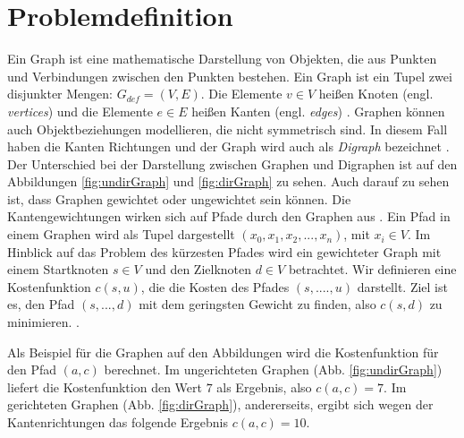 \section{Problemdefinition}
\label{Kostenfunktion}
Ein Graph ist eine mathematische Darstellung von Objekten, die aus Punkten und Verbindungen zwischen den Punkten bestehen. 
Ein Graph ist ein Tupel zwei disjunkter Mengen: $G_{def}= (V,E)$. Die Elemente $v \in V$ heißen Knoten (engl. \textit{vertices}) und die Elemente $e \in E$ heißen Kanten (engl. \textit{edges}) \cite[D1]{Gross.2004}. Graphen können auch Objektbeziehungen modellieren, die nicht symmetrisch sind. In diesem Fall haben die Kanten Richtungen und der Graph wird auch als \textit{Digraph} bezeichnet \cite[D19]{Gross.2004}. Der Unterschied bei der Darstellung zwischen Graphen und Digraphen ist auf den Abbildungen \ref{fig:undirGraph} und \ref{fig:dirGraph} zu sehen. Auch darauf zu sehen ist, dass Graphen gewichtet oder ungewichtet sein können. Die Kantengewichtungen wirken sich auf Pfade durch den Graphen aus \cite[D17f.]{Gross.2004}. 
Ein Pfad in einem Graphen wird als Tupel dargestellt $\left ( x_{0}, x_{1}, x_{2}, ..., x_{n} \right )$, mit $x_{i} \in V$. 
Im Hinblick auf das Problem des kürzesten Pfades wird ein gewichteter Graph mit einem Startknoten $s \in V$ und den Zielknoten $d \in V$ betrachtet. Wir definieren eine Kostenfunktion $c(s,u)$, die die Kosten des Pfades $ (s, ...., u)$ darstellt. Ziel ist es, den Pfad  $\left ( s, ..., d \right )$ mit dem geringsten Gewicht zu finden, also $c(s,d)$ zu minimieren. \cite[S.4]{Madkour.2017}.

Als Beispiel für die Graphen auf den Abbildungen wird die Kostenfunktion für den Pfad $(a,c)$ berechnet. Im ungerichteten Graphen (Abb. \ref{fig:undirGraph}) liefert die Kostenfunktion den Wert $7$ als Ergebnis, also $c(a,c) = 7$. Im gerichteten Graphen (Abb. \ref{fig:dirGraph}), andererseits, ergibt sich wegen der Kantenrichtungen das folgende Ergebnis $c(a,c) = 10$.

